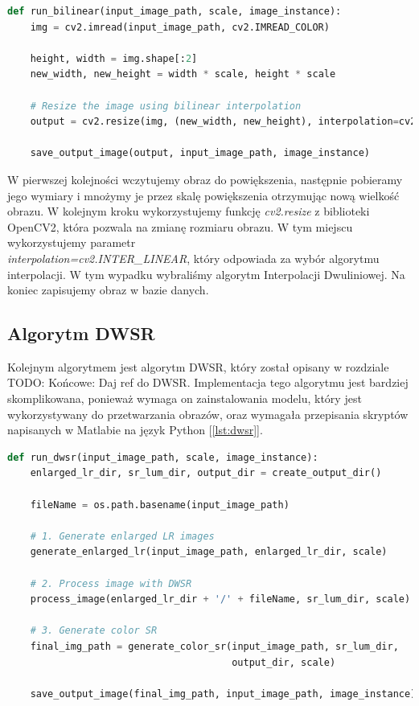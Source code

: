 \begin{lstlisting}[language=Python, caption=Implementacja algorytmu Bilinear., label={lst:bilinear}]
def run_bilinear(input_image_path, scale, image_instance):
    img = cv2.imread(input_image_path, cv2.IMREAD_COLOR)
    
    height, width = img.shape[:2]
    new_width, new_height = width * scale, height * scale

    # Resize the image using bilinear interpolation
    output = cv2.resize(img, (new_width, new_height), interpolation=cv2.INTER_LINEAR)

    save_output_image(output, input_image_path, image_instance)
\end{lstlisting}

W pierwszej kolejności wczytujemy obraz do powiększenia, następnie pobieramy jego wymiary i mnożymy je przez skalę powiększenia otrzymując nową wielkość obrazu. W kolejnym kroku wykorzystujemy funkcję \textit{cv2.resize} z biblioteki OpenCV2, która pozwala na zmianę rozmiaru obrazu. W tym miejscu wykorzystujemy parametr \\ \textit{interpolation=cv2.INTER\_LINEAR}, który odpowiada za wybór algorytmu interpolacji. W tym wypadku wybraliśmy algorytm Interpolacji Dwuliniowej. Na koniec zapisujemy obraz w bazie danych.


\subsection*{Algorytm DWSR}

Kolejnym algorytmem jest algorytm DWSR, który został opisany w rozdziale 
TODO: Końcowe: Daj ref do DWSR.
Implementacja tego algorytmu jest bardziej skomplikowana, ponieważ wymaga on zainstalowania modelu, który jest wykorzystywany do przetwarzania obrazów, oraz wymagała przepisania skryptów napisanych w Matlabie na język Python [\ref{lst:dwsr}].


\begin{lstlisting}[language=Python, caption=Implementacja algorytmu DWSR., label={lst:dwsr}]    
def run_dwsr(input_image_path, scale, image_instance):
    enlarged_lr_dir, sr_lum_dir, output_dir = create_output_dir()

    fileName = os.path.basename(input_image_path)

    # 1. Generate enlarged LR images
    generate_enlarged_lr(input_image_path, enlarged_lr_dir, scale) 

    # 2. Process image with DWSR
    process_image(enlarged_lr_dir + '/' + fileName, sr_lum_dir, scale)

    # 3. Generate color SR
    final_img_path = generate_color_sr(input_image_path, sr_lum_dir, 
                                       output_dir, scale) 

    save_output_image(final_img_path, input_image_path, image_instance)
\end{lstlisting}


